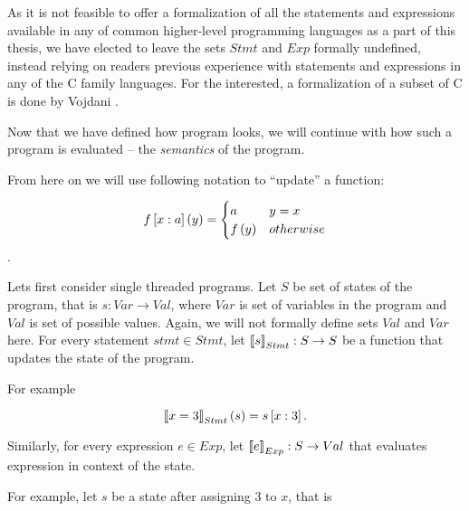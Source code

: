 \documentclass[..thesis.tex]{subfiles}
\begin{document}

As it is not feasible to offer a formalization of all the statements and expressions available in any of common higher-level programming languages
as a part of this thesis, we have elected to leave the sets $Stmt$ and $Exp$ formally undefined, instead relying on readers previous experience
with statements and expressions in any of the C family languages.   For the interested, a formalization of a subset of C is done by Vojdani .




Now that we have defined how program looks, we will continue with how such a program is evaluated -- the \textit{semantics} of the program.

From here on we will use following notation to ``update'' a function:

\begin{equation*}
f \left[ x : a \right] \left( y \right) = 
  \begin{cases}
  a & y = x \\
  f \left(  y \right) & otherwise \\ 
  \end{cases}
\end{equation*}.

Lets first consider single threaded programs. Let $S$ be set of states of the program, that is $s : Var \to Val$, where $Var$ is set of
variables in the program and $Val$ is set of possible values. Again, we will not formally define sets $Val$ and $Var$ here.
For every statement $stmt \in Stmt$, let $ \left\llbracket s \right\rrbracket_{Stmt} : S \to S$ be a function that updates the state of the program. 

For example

\begin{equation*}
 \left\llbracket x = 3 \right\rrbracket_{Stmt} (s) = s \left[ x : 3 \right] \text{.}
\end{equation*}

Similarly, for every expression $e \in Exp$, let $\left\llbracket e \right\rrbracket_{Exp} : S \to Val$ that evaluates expression in context of the state. 

For example, let $s$ be a state after assigning $3$ to $x$, that is
\end{document}
